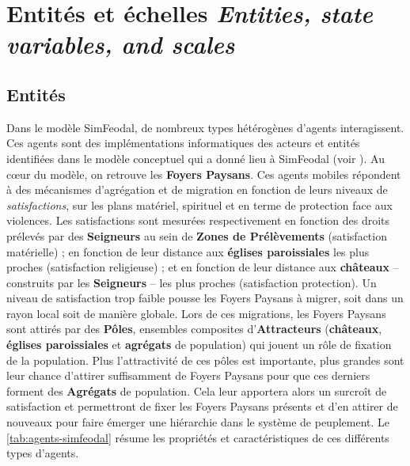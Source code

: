 \let\orisectionmark\sectionmark
\renewcommand\sectionmark[1]{}%
\section[Entités et échelles -- \textit{Entities, state variables, and scales}]{Entités et échelles \protect\newline \large{\textit{Entities, state variables, and scales}}}
\orisectionmark{Entités et échelles}
\let\sectionmark\orisectionmark


\subsection{Entités}

Dans le modèle SimFeodal, de nombreux types hétérogènes d'agents interagissent. Ces agents sont des implémentations informatiques des acteurs et entités identifiées dans le modèle conceptuel qui a donné lieu à SimFeodal (voir \textcite[Tableau 1, \ppno~309--310]{cura_transition_2017}).
Au cœur du modèle, on retrouve les \textbf{Foyers Paysans}. Ces agents mobiles répondent à des mécanismes d'agrégation et de migration en fonction de leurs niveaux de \textit{satisfactions}, sur les plans matériel, spirituel et en terme de protection face aux violences.
Les satisfactions sont mesurées respectivement en fonction des droits prélevés par des \textbf{Seigneurs} au sein de \textbf{Zones de Prélèvements} (satisfaction matérielle) ; en fonction de leur distance aux \textbf{églises paroissiales} les plus proches (satisfaction religieuse) ; et en fonction de leur distance aux \textbf{châteaux} -- construits par les \textbf{Seigneurs} -- les plus proches (satisfaction protection).
Un niveau de satisfaction trop faible pousse les Foyers Paysans à migrer, soit dans un rayon local soit de manière globale.
Lors de ces migrations, les Foyers Paysans sont attirés par des \textbf{Pôles}, ensembles composites d'\textbf{Attracteurs} (\textbf{châteaux}, \textbf{églises paroissiales} et \textbf{agrégats} de population) qui jouent un rôle de fixation de la population.
Plus l'attractivité de ces pôles est importante, plus grandes sont leur chance d'attirer suffisamment de Foyers Paysans pour que ces derniers forment des \textbf{Agrégats} de population.
Cela leur apportera alors un surcroît de satisfaction et permettront de fixer les Foyers Paysans présents et d'en attirer de nouveaux pour faire émerger une hiérarchie dans le système de peuplement.
Le \cref{tab:agents-simfeodal} résume les propriétés et caractéristiques de ces différents types d'agents.


